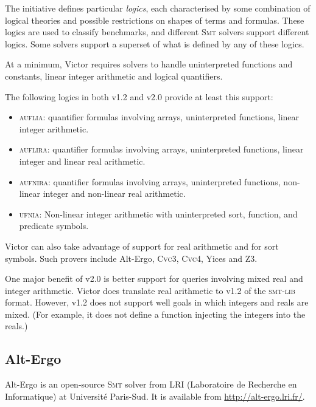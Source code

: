 \documentclass[12pt,fleqn]{article}
\newcommand{\cvcthree}{\textsc{Cvc}3}
\newcommand{\cvcfour}{\textsc{Cvc}4}
\newcommand{\zthree}{\textsc{Z}3}
\newcommand{\yices}{Yices}
\newcommand{\smt}{\textsc{Smt}}
\newcommand{\smtlib}{\textsc{smt-lib}}
\begin{document}
The initiative defines particular \emph{logics}, each characterised by
some combination of logical theories and possible restrictions on
shapes of terms and formulas.  These logics are used to classify
benchmarks, and different \smt{} solvers support different logics.
Some solvers support a superset of what is defined by any of these
logics.

At a minimum, Victor requires solvers to handle uninterpreted
functions and constants, linear integer arithmetic and logical
quantifiers.

The following logics in both v1.2 and v2.0 provide at least this support:
\begin{itemize}
\item \textsc{auflia}: quantifier formulas involving arrays,
  uninterpreted functions, linear integer arithmetic.
\item \textsc{auflira}: quantifier formulas involving arrays,
  uninterpreted functions, linear integer and linear real arithmetic.
\item \textsc{aufnira}: quantifier formulas involving arrays,
  uninterpreted functions, non-linear integer and non-linear real
  arithmetic.
\item 
\textsc{ufnia}: Non-linear integer arithmetic with uninterpreted
  sort, function, and predicate symbols.
\end{itemize}
Victor can also take advantage of support for real arithmetic and for
sort symbols.  Such provers include Alt-Ergo, \cvcthree, \cvcfour,
\yices{} and \zthree.

One major benefit of v2.0 is better support for queries involving
mixed real and integer arithmetic.  Victor does translate real
arithmetic to v1.2 of the \smtlib{} format. However, v1.2 does not
support well goals in which integers and reals are mixed. (For
example, it does not define a function injecting the integers into the
reals.)
  

\subsection{Alt-Ergo}

Alt-Ergo is an open-source \smt{} solver from LRI (Laboratoire de
Recherche en Informatique) at Universit\'e Paris-Sud.  It is available
from \url{http://alt-ergo.lri.fr/}.
\end{document}
